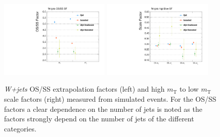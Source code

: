 \begin{figure}[h!]
    \centering
    \includegraphics[width=0.47\textwidth]{Figures/background_estimation/Wjets_OSSS.pdf}
    \includegraphics[width=0.47\textwidth]{Figures/background_estimation/Wjets_h2l.pdf}
    \caption[\textit{W+jets} extrapolation factors.]{\textit{W+jets} OS/SS extrapolation factors (left) and high $m_\text{T}$ to low $m_\text{T}$ scale factors (right) measured from simulated events.
    For the OS/SS factors a clear dependence on the number of jets is noted as the factors strongly depend on the number of jets of the different categories.}\label{W:Scale_factors}
\end{figure}

